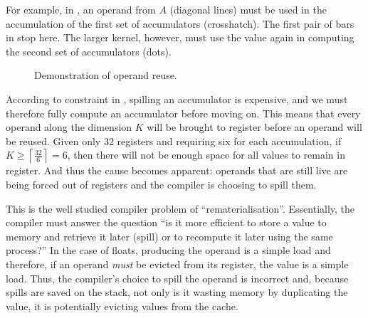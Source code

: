 \documentclass[\main/thesis.tex]{subfiles}
\begin{document}
For example, in , an operand from $A$ (diagonal lines) must be used in the accumulation of the first set of accumulators (crosshatch).
The first pair of bars in  stop here.
The larger kernel, however, must use the value again in computing the second set of accumulators (dots).

\begin{figure}[t]
  \centering
  \caption{Demonstration of operand reuse.}
  \label{fig:opReuse}
\end{figure}

According to constraint  in , spilling an accumulator is expensive, and we must therefore fully compute an accumulator before moving on.
This means that every operand along the dimension $K$ will be brought to register before an operand will be reused.
Given only 32 registers and requiring six for each accumulation, if $K \geq \left\lceil \frac{32}{6} \right\rceil = 6$, then there will not be enough space for all values to remain in register\footnotemark.
And thus the cause becomes apparent: operands that are still \gls{live} are being forced out of registers and the compiler is choosing to spill them.

This is the well studied compiler problem of ``\gls{rematerialisation}''.
Essentially, the compiler must answer the question ``is it more efficient to store a value to memory and retrieve it later (\gls{spill}) or to recompute it later using the same process?''
In the case of floats, producing the operand is a simple load and therefore, if an operand \emph{must} be evicted from its register,  the value is a simple load.
Thus, the compiler's choice to spill the operand is incorrect and, because spills are saved on the stack, not only is it wasting memory by duplicating the value, it is potentially evicting values from the cache.
\end{document}
